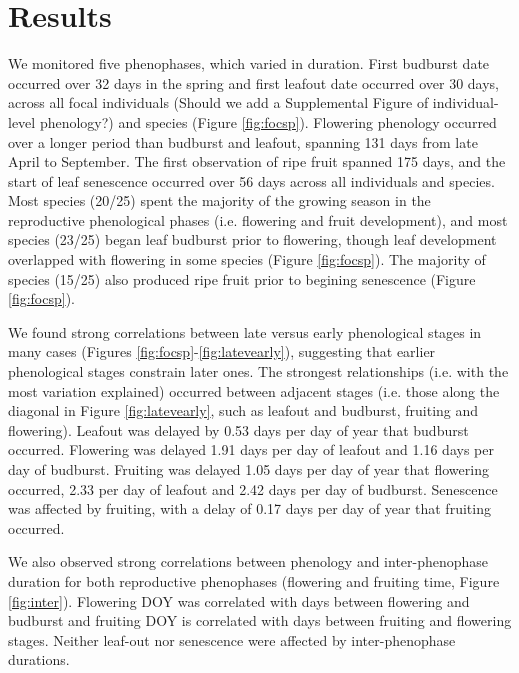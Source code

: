 \documentclass{article}
\begin{document}
\section* {Results}
\par We monitored five phenophases, which varied in duration. First budburst date occurred over 32 days in the spring and first leafout date occurred over 30 days, across all focal individuals (Should we add a Supplemental Figure of individual-level phenology?) and species (Figure \ref{fig:focsp}). Flowering phenology occurred over a longer period than budburst and leafout, spanning 131 days from late April to September. The first observation of ripe fruit spanned 175 days, and the start of leaf senescence occurred over 56 days across all individuals and species. 
Most species (20/25) spent the majority of the growing season in the reproductive phenological phases (i.e. flowering and fruit development), and most species (23/25) began leaf budburst prior to flowering, though leaf development overlapped with flowering in some species (Figure \ref{fig:focsp}). The majority of species (15/25) also produced ripe fruit prior to begining senescence (Figure \ref{fig:focsp}).
\par We found strong correlations between late versus early phenological stages in many cases (Figures \ref{fig:focsp}-\ref{fig:latevearly}), suggesting that earlier phenological stages constrain later ones. The strongest relationships (i.e. with the most variation explained) occurred between adjacent stages (i.e. those along the diagonal in Figure \ref{fig:latevearly}, such as leafout and budburst, fruiting and flowering). 
Leafout was delayed by 0.53 days per day of year that budburst occurred. Flowering was delayed 1.91 days per day of leafout and 1.16 days per day of budburst. Fruiting was delayed 1.05 days per day of year that flowering occurred, 2.33 per day of leafout and 2.42 days per day of budburst. Senescence was affected by fruiting, with a delay of 0.17 days per day of year that fruiting occurred.%

\par We also observed strong correlations between phenology and inter-phenophase duration for both reproductive phenophases (flowering and fruiting time, Figure \ref{fig:inter}). Flowering DOY was correlated with days between flowering and budburst and fruiting DOY is correlated with days between fruiting and flowering stages. Neither leaf-out nor senescence were affected by inter-phenophase durations.
\end{document}
